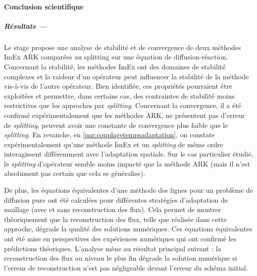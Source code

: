 \label{par:cc}
\paragraph*{Conclusion scientifique}\label{par:cc1}
\subparagraph*{Résultats —}  
Le stage propose une analyse de stabilité et de convergence de deux méthodes ImEx ARK comparées au splitting sur une équation de diffusion-réaction. 
Concernant la stabilité, les méthodes ImEx ont des domaines de stabilité complexes et la raideur d'un opérateur peut influencer la stabilité de la méthode vis-à-vis de l'autre opérateur. 
Bien identifiée, ces propriétés pourraient être exploitées et permettre, dans certains cas, des contraintes de stabilité moins restrictives que les approches par \textit{splitting}. Concernant la
convergence, il a été confirmé expérimentalement que les méthodes ARK, ne présentent pas d'erreur de \emph{splitting}, peuvent avoir une constante de convergence plus faible 
que le \emph{splitting}. En revanche, en \ref{par:couplagetempsadaptation}, on constate expérimentalement qu'une méthode ImEx et un \emph{splitting} de même ordre interagissent différemment avec l'adaptation spatiale.
Sur le cas particulier étudié, le \textit{splitting} d'opérateur semble moins impacté que la méthode ARK (mais il n'est absolument pas certain que cela se généralise).\par

De plus, les équations équivalentes d'une méthode des lignes pour un problème de diffusion pure ont été calculées 
pour différentes stratégies d'adaptation de maillage (avec et sans reconstruction des flux). 
Cela permet de montrer théoriquement que la reconstruction des flux, telle que réalisée dans cette approche, dégrade la qualité des solutions numériques.
Ces équations équivalentes ont été mise en perspectives des expériences numériques qui ont confirmé les prédictions théoriques.
L'analyse mène au résultat principal suivant : la reconstruction des flux au niveau le plus fin dégrade la solution numérique si l'erreur de reconstruction n'est pas négligeable devant l'erreur du schéma initial.

